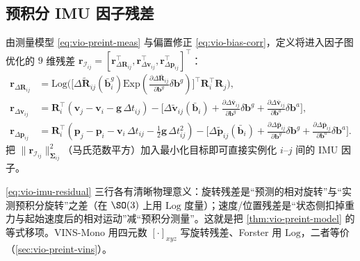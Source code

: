 \subsection{预积分 IMU 因子残差}
\label{sec:vio-imu-factor}

\begin{theorem}\label{thm:vio-imu-residual}
由测量模型 \cref{eq:vio-preint-meas} 与偏置修正 \cref{eq:vio-bias-corr}，定义将进入因子图优化的 $9$ 维残差 $\mathbf{r}_{\mathcal{I}_{ij}}=[\mathbf{r}_{\Delta\mathbf{R}_{ij}}^\top,\mathbf{r}_{\Delta\mathbf{v}_{ij}}^\top,\mathbf{r}_{\Delta\mathbf{p}_{ij}}^\top]^\top$\cite{forster2017preintegration}：
\begin{equation}
\begin{aligned}
  \mathbf{r}_{\Delta\mathbf{R}_{ij}}&=\mathrm{Log}\!\Big(\big[\Delta\tilde{\mathbf{R}}_{ij}(\bar{\mathbf{b}}^g_i)\mathrm{Exp}(\tfrac{\partial\Delta\bar{\mathbf{R}}_{ij}}{\partial\mathbf{b}^g}\delta\mathbf{b}^g)\big]^\top\mathbf{R}_i^\top\mathbf{R}_j\Big),\\
  \mathbf{r}_{\Delta\mathbf{v}_{ij}}&=\mathbf{R}_i^\top(\mathbf{v}_j-\mathbf{v}_i-\mathbf{g}\,\Delta t_{ij})-\big[\Delta\tilde{\mathbf{v}}_{ij}(\bar{\mathbf{b}}_i)+\tfrac{\partial\Delta\bar{\mathbf{v}}_{ij}}{\partial\mathbf{b}^g}\delta\mathbf{b}^g+\tfrac{\partial\Delta\bar{\mathbf{v}}_{ij}}{\partial\mathbf{b}^a}\delta\mathbf{b}^a\big],\\
  \mathbf{r}_{\Delta\mathbf{p}_{ij}}&=\mathbf{R}_i^\top(\mathbf{p}_j-\mathbf{p}_i-\mathbf{v}_i\,\Delta t_{ij}-\tfrac12\mathbf{g}\,\Delta t_{ij}^2)-\big[\Delta\tilde{\mathbf{p}}_{ij}(\bar{\mathbf{b}}_i)+\tfrac{\partial\Delta\bar{\mathbf{p}}_{ij}}{\partial\mathbf{b}^g}\delta\mathbf{b}^g+\tfrac{\partial\Delta\bar{\mathbf{p}}_{ij}}{\partial\mathbf{b}^a}\delta\mathbf{b}^a\big].
\end{aligned}
  \label{eq:vio-imu-residual}
\end{equation}
把 $\|\mathbf{r}_{\mathcal{I}_{ij}}\|^2_{\boldsymbol{\Sigma}_{ij}}$（马氏范数平方）加入最小化目标即可直接实例化 $i$--$j$ 间的 IMU 因子。
\end{theorem}

\begin{insight}
\cref{eq:vio-imu-residual} 三行各有清晰物理意义：旋转残差是“预测的相对旋转”与“实测预积分旋转”之差（在 $\SO(3)$ 上用 $\mathrm{Log}$ 度量）；速度/位置残差是“状态侧扣掉重力与起始速度后的相对运动”减“预积分测量”。这就是把 \cref{thm:vio-preint-model} 的等式移项。VINS-Mono 用四元数 $[\cdot]_{xyz}$ 写旋转残差、Forster 用 $\mathrm{Log}$，二者等价（\cref{sec:vio-preint-vins}）。
\end{insight}

